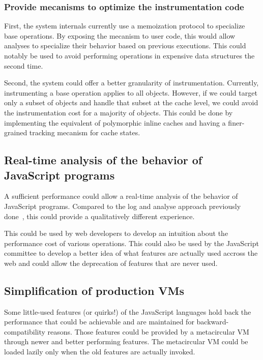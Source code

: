 \subsubsection{Provide mecanisms to optimize the instrumentation code}

First, the system internals currently use a memoization protocol to specialize base
operations. By exposing the mecanism to user code, this would allow analyses to
specialize their behavior based on previous executions. This could notably be
used to avoid performing operations in expensive data structures the second
time.

Second, the system could offer a better granularity of instrumentation.
Currently, instrumenting a base operation applies to all objects. However, if
we could target only a subset of objects and handle that subset at the cache
level, we could avoid the instrumentation cost for a majority of objects. This
could be done by implementing the equivalent of polymorphic inline caches and
having a finer-grained tracking mecanism for cache states.

\subsection{Real-time analysis of the behavior of JavaScript programs}

A sufficient performance could allow a real-time analysis of the behavior of
JavaScript programs. Compared to the log and analyse approach previously
done~\cite{behavior_js}, this could provide a qualitatively different
experience.

This could be used by web developers to develop an intuition about the
performance cost of various operations. This could also be used by the
JavaScript committee to develop a better idea of what features are actually
used accross the web and could allow the deprecation of features that are never
used.

\subsection{Simplification of production VMs}

Some little-used features (or quirks!) of the JavaScript languages hold back
the performance that could be achievable and are maintained for
backward-compatibility reasons. Those features could be provided by a
metacircular VM through newer and better performing features.  The
metacircular VM could be loaded lazily only when the old features are actually
invoked.

